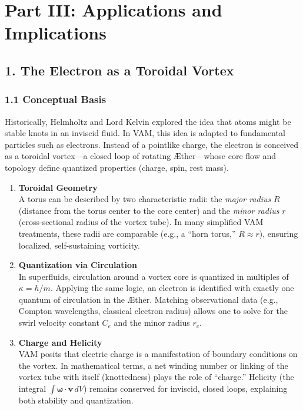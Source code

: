\documentclass[aps,preprint,superscriptaddress]{revtex4-2}
\begin{document}
    \section*{Part III: Applications and Implications}\label{sec:part-3}

    \subsection*{1. The Electron as a Toroidal Vortex}

    \subsubsection*{1.1 Conceptual Basis}
    Historically, Helmholtz and Lord Kelvin explored the idea that atoms might be stable knots in an inviscid fluid. In VAM, this idea is adapted to fundamental particles such as electrons. Instead of a pointlike charge, the electron is conceived as a toroidal vortex—a closed loop of rotating Æther—whose core flow and topology define quantized properties (charge, spin, rest mass).

    \begin{enumerate}
        \item \textbf{Toroidal Geometry} \\
        A torus can be described by two characteristic radii: the \textit{major radius} \(R\) (distance from the torus center to the core center) and the \textit{minor radius} \(r\) (cross-sectional radius of the vortex tube). In many simplified VAM treatments, these radii are comparable (e.g., a “horn torus,” \(R \approx r\)), ensuring localized, self-sustaining vorticity.

        \item \textbf{Quantization via Circulation} \\
    In superfluids, circulation around a vortex core is quantized in multiples of \(\kappa = h/m\). Applying the same logic, an electron is identified with exactly one quantum of circulation in the Æther. Matching observational data (e.g., Compton wavelengths, classical electron radius) allows one to solve for the swirl velocity constant \(C_e\) and the minor radius \(r_c\).

        \item \textbf{Charge and Helicity} \\
    VAM posits that electric charge is a manifestation of boundary conditions on the vortex. In mathematical terms, a net winding number or linking of the vortex tube with itself (knottedness) plays the role of “charge.” Helicity (the integral \(\int \boldsymbol{\omega}\cdot \mathbf{v}\, dV\)) remains conserved for inviscid, closed loops, explaining both stability and quantization.
    \end{enumerate}
\end{document}
